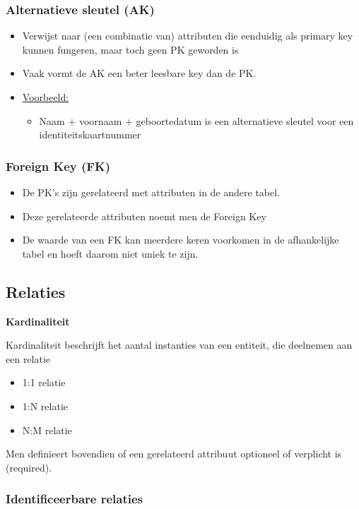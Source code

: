 \documentclass{article}
\newcommand{\bold}[1]{\textbf{#1}}
\begin{document}
\subsubsection{Alternatieve sleutel (AK)}

\begin{itemize}
    \item Verwijst naar (een combinatie van) attributen die eenduidig als primary key kunnen fungeren, maar toch geen PK geworden is
    \item Vaak vormt de AK een beter leesbare key dan de PK.
    \item \underline{Voorbeeld:}
    \begin{itemize}
        \item Naam + voornaam + geboortedatum is een alternatieve sleutel voor een identiteitskaartnummer
    \end{itemize}
\end{itemize}


\subsubsection{Foreign Key (FK)}
\begin{itemize}
    \item De PK's zijn gerelateerd met attributen in de andere tabel. 
    \item Deze gerelateerde attributen noemt men de Foreign Key 
    \item De waarde van een FK kan meerdere keren voorkomen in de afhankelijke tabel en hoeft daarom niet uniek te zijn.
\end{itemize}

\subsection{Relaties}
\bold{Kardinaliteit}

Kardinaliteit beschrijft het aantal instanties van een entiteit, die deelnemen aan een relatie
\begin{itemize}
    \item 1:1 relatie
    \item 1:N relatie
    \item N:M relatie
\end{itemize}

Men definieert bovendien of een gerelateerd attribuut optioneel of verplicht is (required). 

\subsubsection{Identificeerbare relaties}
\end{document}
